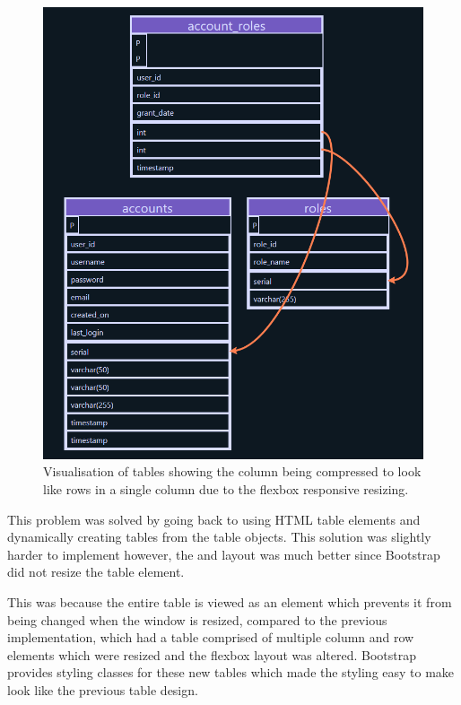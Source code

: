 \begin{figure}[h!]
	\centering
	\includegraphics[scale=0.5]{postSquash}
	\caption{Visualisation of tables showing the column being compressed to look like rows in a single column due to the flexbox responsive resizing.}
	\label{fig:squash}
\end{figure}

This problem was solved by going back to using HTML table elements and dynamically creating tables from the table objects. This solution was slightly harder to implement however, the and layout was much better since Bootstrap did not resize the table element. 

This was because the entire table is viewed as an element which prevents it from being changed when the window is resized, compared to the previous implementation, which had a table comprised of multiple column and row elements which were resized and the flexbox layout was altered. Bootstrap provides styling classes for these new tables which made the styling easy to make look like the previous table design.

